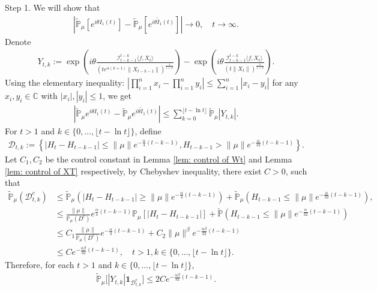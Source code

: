 \documentclass[12pt,oneside,english]{amsart}
\theoremstyle{plain}
\theoremstyle{definition}
\numberwithin{equation}{section}
\newcommand{\added}[1]{{\color{blue}#1}}\newcommand{\deleted}[1]{{\color{red}#1}}
\begin{document}
    Step 1. We will show that
    \begin{align}
        |\mathbb{\tilde{P}}_{\mu}[e^{i\theta I_1(t)}]-\mathbb{\tilde{P}}_{\mu}[e^{i\theta\tilde{I}_1(t)}]|\rightarrow 0,\quad t\rightarrow \infty.
    \end{align}
    Denote
    \begin{align*}
        Y_{t,k}:=\exp\left(i\theta\frac{\mathcal I_{t-k-1}^{t-k}\langle f ,X_t\rangle}{(t e^{\alpha(k+1)}\|X_{t-k-1}\|)^{\frac{1}{1+\beta}}}\right)-\exp\left(i\theta\frac{\mathcal I_{t-k-1}^{t-k}\langle f ,X_t\rangle}{\left(t\|X_t\|\right)^{\frac{1}{1+\beta}}}\right).
    \end{align*}
    Using the elementary inequality: $|\prod_{i=1}^n x_i-\prod_{i=1}^n y_i|\leq\sum_{i=1}^n |x_i-y_i|$ for any $x_i,y_i \in \mathbb{C}$ with $|x_i|,|y_i|\leq 1$, we get
    \begin{align}\label{ineq: control of I1t}
        \left|\mathbb{\tilde{P}}_{\mu}e^{i\theta I_1(t)}-\mathbb{\tilde{P}}_{\mu}e^{i\theta\tilde{I}_1(t)}\right|\leq \sum_{k=0}^{\lfloor t-\ln t \rfloor}\mathbb{\tilde{P}}_{\mu}|Y_{t,k}|.
    \end{align}
    For $t>1$ and $k\in \{0,...,\lfloor t-\ln t \rfloor\}$, define
    \begin{align*}
        \mathcal{D}_{t,k}:=\left\{|H_t-H_{t-k-1}|\leq \|\mu\| e^{-\frac{\alpha}{4}(t-k-1)}, H_{t-k-1}>\|\mu\|e^{-\frac{\alpha}{32}(t-k-1)}\right\}.
    \end{align*}
    Let $C_1,C_2$ be the control constant in  Lemma \ref{lem: control of Wt} and Lemma \ref{lem: control of XT} respectively, by Chebyshev inequality,
     there exist $C>0$, such that
    \added{
    \begin{align*}
        \mathbb{\tilde{P}}_{\mu}(\mathcal{D}_{t,k}^c)&\leq \mathbb{\tilde{P}}_{\mu}(|H_t-H_{t-k-1}|\geq \|\mu\| e^{-\frac{\alpha}{4}(t-k-1)})+\mathbb{\tilde{P}}_{\mu}(H_{t-k-1}\leq \|\mu\|e^{-\frac{\alpha}{32}(t-k-1)}),\\
        &\leq \frac{\|\mu\|}{\mathbb{P}_{\mu}(D^c)}e^{\frac{\alpha}{4}(t-k-1)}\mathbb{P}_{\mu}[|H_t-H_{t-k-1}|]+\mathbb{\tilde{P}}(H_{t-k-1}\leq\|\mu\|e^{-\frac{\alpha}{32}(t-k-1)})
        \\&\leq C_1  \frac{\|\mu\|}{\mathbb{P}_{\mu}(D^c)}e^{-\frac{\alpha}{4}(t-k-1)}+C_2\|\mu\|^{\beta}e^{-\frac{\alpha\beta}{32}(t-k-1)}
        \\&\leq Ce^{-\frac{\alpha\beta}{32}(t-k-1)},\quad t>1, k\in \{0,...,\lfloor t-\ln t \rfloor\}.
    \end{align*}
    }
  Therefore, for each $t>1$ and $k\in \{0,...,\lfloor t-\ln t \rfloor\}$,
    \begin{align}
        \mathbb{\tilde{P}}_{\mu}\big[|Y_{t,k}|\mathbf{1}_{\mathcal{D}^c_{t,k}}\big]\leq 2 C e^{-\frac{\alpha\beta}{32}(t-k-1)}.\label{thm121}
    \end{align}
\end{document}
